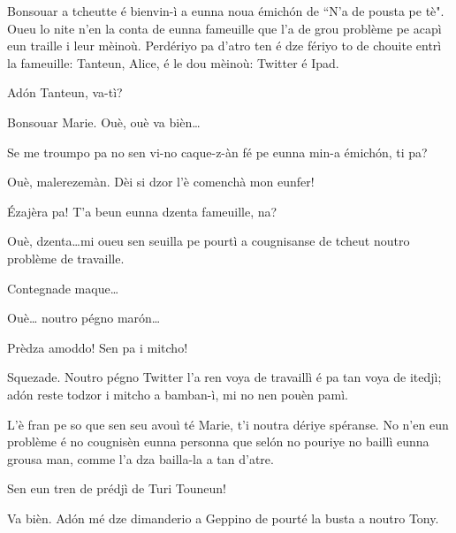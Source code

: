 \begin{drama}
\Mariespeaks Bonsouar a tcheutte é bienvin-ì a eunna noua émich\'on de ``N’a de pousta pe tè". Oueu lo nite n'en la conta de eunna fameuille que l’a de grou problème pe acapì eun traille i leur mèinoù. Perdériyo pa d'atro ten é dze fériyo to de chouite entrì la fameuille: Tanteun, Alice,  é le dou mèinoù: Twitter é Ipad.


\Mariespeaks Ad\'on Tanteun, va-tì?

\Tanteunspeaks{} Bonsouar Marie. Ouè, ouè va bièn\ldots

\Mariespeaks Se me troumpo pa no sen vi-no caque-z-àn fé pe eunna min-a émich\'on, ti pa?

\Tanteunspeaks{} Ouè,  malerezemàn. Dèi si dzor l’è comenchà mon eunfer!

\Mariespeaks \'Ezajèra pa! T’a beun eunna dzenta fameuille, na?

\Tanteunspeaks Ouè, dzenta\ldots mi oueu sen seuilla pe pourtì a cougnisanse de tcheut noutro problème de travaille.

\Mariespeaks Contegnade maque\ldots

\Tanteunspeaks Ouè\ldots {} noutro pégno mar\'on\ldots


\Alicespeaks Prèdza amoddo! Sen pa i mitcho!

\Tanteunspeaks Squezade. Noutro pégno Twitter l’a ren voya de travaillì é pa tan voya de itedjì; ad\'on reste todzor i mitcho a bamban-ì, mi no nen pouèn pamì.

\Alicespeaks L’è fran pe so que sen seu avouì té Marie, t’i noutra dériye spéranse. No n'en eun problème é no cougnisèn eunna personna que sel\'on no pouriye no baillì eunna grousa man, comme  l’a dza bailla-la a tan d’atre.

\Twitterspeaks{} Sen eun tren de prédjì de Turi Touneun!

\Mariespeaks Va bièn. Ad\'on mé dze dimanderio a Geppino de pourté la busta a noutro Tony.



\end{drama}
